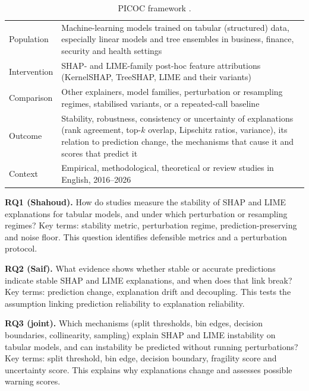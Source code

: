 \begin{table}[H]
\centering\small
\caption{PICOC framework \cite{petticrew2006}.}\label{tab:picoc}
\begin{tabularx}{\textwidth}{@{}P{2.3cm}L@{}}
\toprule
Population & Machine-learning models trained on tabular (structured) data, especially linear models and tree ensembles in business, finance, security and health settings \\
Intervention & SHAP- and LIME-family post-hoc feature attributions (KernelSHAP, TreeSHAP, LIME and their variants) \\
Comparison & Other explainers, model families, perturbation or resampling regimes, stabilised variants, or a repeated-call baseline \\
Outcome & Stability, robustness, consistency or uncertainty of explanations (rank agreement, top-$k$ overlap, Lipschitz ratios, variance), its relation to prediction change, the mechanisms that cause it and scores that predict it \\
Context & Empirical, methodological, theoretical or review studies in English, 2016--2026 \\
\bottomrule
\end{tabularx}
\end{table}
\vspace{-6pt}
\textbf{RQ1 (Shahoud).} How do studies measure the stability of SHAP and LIME explanations for tabular models, and under which perturbation or resampling regimes? Key terms: stability metric, perturbation regime, prediction-preserving and noise floor. This question identifies defensible metrics and a perturbation protocol.

\textbf{RQ2 (Saif).} What evidence shows whether stable or accurate predictions indicate stable SHAP and LIME explanations, and when does that link break? Key terms: prediction change, explanation drift and decoupling. This tests the assumption linking prediction reliability to explanation reliability.

\textbf{RQ3 (joint).} Which mechanisms (split thresholds, bin edges, decision boundaries, collinearity, sampling) explain SHAP and LIME instability on tabular models, and can instability be predicted without running perturbations? Key terms: split threshold, bin edge, decision boundary, fragility score and uncertainty score. This explains why explanations change and assesses possible warning scores.

